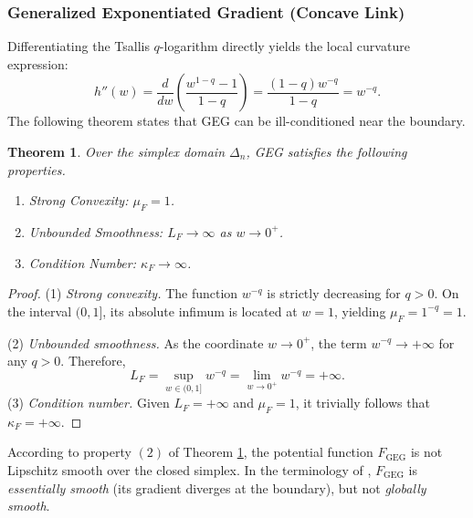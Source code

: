 \documentclass[10pt]{amsart}
\newcommand{\beq}{\begin{equation}}
\newcommand{\eeq}{\end{equation}}
\newtheorem{theorem}{Theorem}
\newtheorem{lemma}{Lemma}
\theoremstyle{definition}
\theoremstyle{definition}	 %
\begin{document}
\subsubsection{Generalized Exponentiated Gradient (Concave Link)}

Differentiating the Tsallis $q$-logarithm directly yields the local curvature expression:
\beq \label{eq:54}
h''(w) = \frac{d}{dw}\left(\frac{w^{1-q}-1}{1-q}\right) = \frac{(1-q)w^{-q}}{1-q} = w^{-q}.
\eeq
The following theorem states that GEG can be ill-conditioned near the boundary.
\begin{theorem} \label{thm:GEG_illcond}
Over the simplex domain $\Delta_n$, GEG satisfies the following properties.
\begin{enumerate}
    \item \textit{Strong Convexity:} $\mu_F = 1$. %
    \item \textit{Unbounded Smoothness:} $L_F \to \infty$ as $w \to 0^+$.
    \item \textit{Condition Number:} $\kappa_F \to \infty$.
\end{enumerate}
\end{theorem}
\begin{proof}
(1) \textit{Strong convexity.} The function $w^{-q}$ is strictly decreasing for $q>0$. On the interval $(0,1]$, its absolute infimum is located at $w=1$, yielding $\mu_F = 1^{-q} = 1$.

(2) \textit{Unbounded smoothness.} As the coordinate $w\to 0^+$, the term $w^{-q}\to +\infty$ for any $q>0$. Therefore,
\[
L_F = \sup_{w \in(0,1]} w^{-q} = \lim_{w \to 0^+} w^{-q} = +\infty.
\]
(3) \textit{Condition number.} Given $L_F=+\infty$ and $\mu_F=1$, it trivially follows that $\kappa_F = +\infty$.
\end{proof}
According to property $(2)$ of Theorem \ref{thm:GEG_illcond},   the potential function $F_{\text{GEG}}$ is not Lipschitz smooth over the closed simplex. In the terminology of \cite{BauschkeBorweinCombettes2001}, $F_{\text{GEG}}$ is \emph{essentially smooth} (its gradient diverges at the boundary), but not \emph{globally smooth}.
\end{document}
